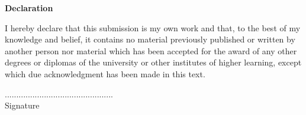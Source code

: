 \documentclass[11pt, a4paper]{report}
\begin{document}
\newpage


\begin{center}
        \vspace*{1cm}
         \LARGE
        \textbf{Declaration}
        
        \vspace{1.5cm}
 \justify      
		I hereby declare that this submission is my own work and that, to the best of my knowledge and belief, it contains no material previously published or written by another person nor material which has been accepted for the award of any other degrees or diplomas of the university or other institutes of higher learning, except which due acknowledgment has been made in this text.         
        
        \vspace{5.5cm}
        
  \begin{flushleft}
   ...............................................\\
      \hspace{2.5cm}Signature
\end{flushleft}        
      
 
        
        \vfill
        
       
        
        
        
    \end{center}
\end{document}
